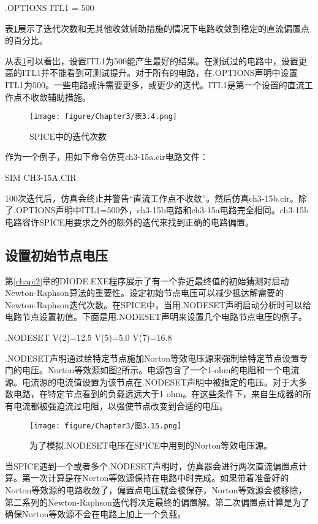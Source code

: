 .OPTIONS ITL1 = 500

表\ref{表3.4}展示了迭代次数和无其他收敛辅助措施的情况下电路收敛到稳定的直流偏置点的百分比。

从表\ref{表3.4}可以看出，设置ITL1为500能产生最好的结果。在测试过的电路中，设置更高的ITL1并不能看到可测试提升。对于所有的电路，在.OPTIONS声明中设置ITL1为500。一些电路或许需要更多，或更少的迭代。ITL1是第一个设置的直流工作点不收敛辅助措施。

\begin{figure}[htbp]
\small
    \centering
    \texttt{[image: figure/Chapter3/表3.4.png]}
    \caption{SPICE中的迭代次数}
    \label{表3.4}
\end{figure}

作为一个例子，用如下命令仿真ch3-15a.cir电路文件：

SIM CH3-15A.CIR

100次迭代后，仿真会终止并警告“直流工作点不收敛”。然后仿真ch3-15b.cir。除了.OPTIONS声明中ITL1=500外，ch3-15b电路和ch3-15a电路完全相同。ch3-15b电路容许SPICE用要求之外的额外的迭代来找到正确的电路偏置。

\subsection{设置初始节点电压}
第\ref{chap:2}章的DIODE.EXE程序展示了有一个靠近最终值的初始猜测对启动Newton-Raphson算法的重要性。设定初始节点电压可以减少抵达解需要的Newton-Raphson迭代次数。在SPICE中，当用.NODESET声明启动分析时可以给电路节点设置初值。下面是用.NODESET声明来设置几个电路节点电压的例子。

.NODESET V(2)=12.5 V(5)=5.0 V(7)=16.8

.NODESET声明通过给特定节点施加Norton等效电压源来强制给特定节点设置专门的电压。Norton等效源如图\ref{图3.15}所示。电源包含了一个1-ohm的电阻和一个电流源。电流源的电流值设置为该节点在.NODESET声明中被指定的电压。对于大多数电路，在特定节点看到的负载远远大于1 ohm。在这些条件下，来自生成器的所有电流都被强迫流过电阻，以强使节点改变到合适的电压。

\begin{figure}[htbp]
\small
    \centering
    \texttt{[image: figure/Chapter3/图3.15.png]}
    \caption{为了模拟.NODESET电压在SPICE中用到的Norton等效电压源。}
    \label{图3.15}
\end{figure}

当SPICE遇到一个或者多个.NODESET声明时，仿真器会进行两次直流偏置点计算。第一次计算是在Norton等效源保持在电路中时完成。如果带着准备好的Norton等效源的电路收敛了，偏置点电压就会被保存，Norton等效源会被移除，第二系列的Newton-Raphson迭代将决定最终的偏置解。第二次偏置点计算是为了确保Norton等效源不会在电路上加上一个负载。

